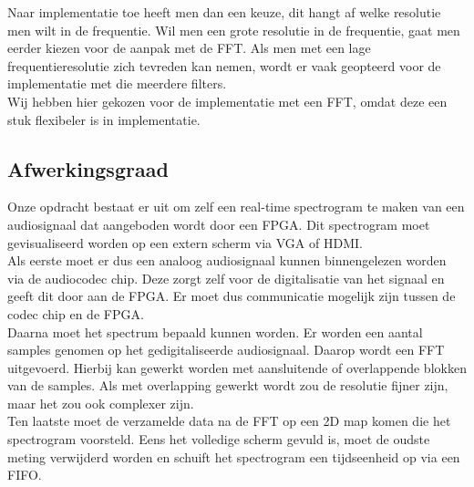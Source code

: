 \documentclass[a4paper,kul]{kulakarticle} %
\begin{document}
Naar implementatie toe heeft men dan een keuze, dit hangt af welke resolutie men wilt in de frequentie. Wil men een grote resolutie in de frequentie, gaat men eerder kiezen voor de aanpak met de FFT. Als men met een lage frequentieresolutie zich tevreden kan nemen, wordt er vaak geopteerd voor de implementatie met die meerdere filters.\\
Wij hebben hier gekozen voor de implementatie met een FFT, omdat deze een stuk flexibeler is in implementatie.


\subsection{Afwerkingsgraad}

Onze opdracht bestaat er uit om zelf een real-time spectrogram te maken van een audiosignaal dat aangeboden wordt door een FPGA. Dit spectrogram moet gevisualiseerd worden op een extern scherm via VGA of HDMI. \\

Als eerste moet er dus een analoog audiosignaal kunnen binnengelezen worden via de audiocodec chip. Deze zorgt zelf voor de digitalisatie van het signaal en geeft dit door aan de FPGA. Er moet dus communicatie mogelijk zijn tussen de codec chip en de FPGA. \\
Daarna moet het spectrum bepaald kunnen worden. Er worden een aantal samples genomen op het gedigitaliseerde audiosignaal. Daarop wordt een FFT uitgevoerd. Hierbij kan gewerkt worden met aansluitende of overlappende blokken van de samples. Als met overlapping gewerkt wordt zou de resolutie fijner zijn, maar het zou ook complexer zijn. \\
Ten laatste moet de verzamelde data na de FFT op een 2D map komen die het spectrogram voorsteld. Eens het volledige scherm gevuld is, moet de oudste meting verwijderd worden en schuift het spectrogram een tijdseenheid op via een FIFO. \\
\end{document}
